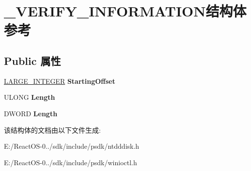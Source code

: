 \hypertarget{struct___v_e_r_i_f_y___i_n_f_o_r_m_a_t_i_o_n}{}\section{\+\_\+\+V\+E\+R\+I\+F\+Y\+\_\+\+I\+N\+F\+O\+R\+M\+A\+T\+I\+O\+N结构体 参考}
\label{struct___v_e_r_i_f_y___i_n_f_o_r_m_a_t_i_o_n}
\subsection*{Public 属性}
\begin{DoxyCompactItemize}
\item 
\mbox{\label{struct___v_e_r_i_f_y___i_n_f_o_r_m_a_t_i_o_n_a0cd0413f0fb4978874c26e412c3ce0db}} 
\hyperlink{union___l_a_r_g_e___i_n_t_e_g_e_r}{L\+A\+R\+G\+E\+\_\+\+I\+N\+T\+E\+G\+ER} {\bfseries Starting\+Offset}
\item 
\mbox{\label{struct___v_e_r_i_f_y___i_n_f_o_r_m_a_t_i_o_n_a1e9a3d94b3ffe656df5ff7b0afefecf7}} 
U\+L\+O\+NG {\bfseries Length}
\item 
\mbox{\label{struct___v_e_r_i_f_y___i_n_f_o_r_m_a_t_i_o_n_a1e9a3d94b3ffe656df5ff7b0afefecf7}} 
D\+W\+O\+RD {\bfseries Length}
\end{DoxyCompactItemize}


该结构体的文档由以下文件生成\+:\begin{DoxyCompactItemize}
\item 
E\+:/\+React\+O\+S-\/0../sdk/include/psdk/ntdddisk.\+h\item 
E\+:/\+React\+O\+S-\/0../sdk/include/psdk/winioctl.\+h\end{DoxyCompactItemize}

